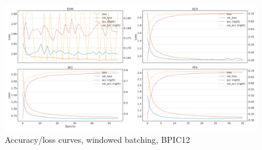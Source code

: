 \begin{figure}[!htb]
    \centering
    \includegraphics[width=\textwidth]{gfx/bpic2012/windowed_loss_acc_curve.png}
    \caption{Accuracy/loss curves, windowed batching, BPIC12}
\end{figure}
\FloatBarrier


